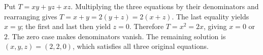 Put $T=xy+yz+xz$. Multiplying the three equations by their denominators and rearranging gives $T=x+y=2(y+z)=2(x+z)$. The last equality yields $x=y$; the first and last then yield $z=0$. Therefore $T=x^2=2x$, giving $x=0$ or $2$. The zero case makes denominators vanish. The remaining solution is $\boxed{(x,y,z)=(2,2,0)}$, which satisfies all three original equations.
